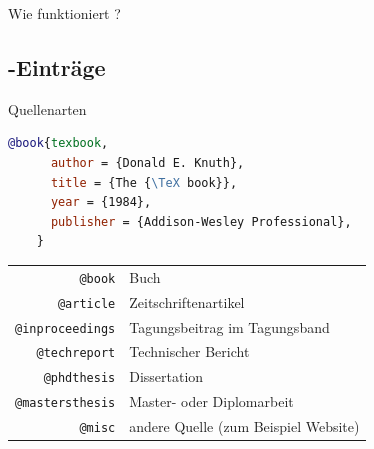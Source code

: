 \begin{Frame}{Wie funktioniert \BibTeX?}
\end{Frame}

\subsection{\BibTeX-Einträge}

\begin{Frame}[fragile]{Quellenarten}
  \begin{lstlisting}[gobble=4,language=BibTeX]
    @book{texbook,
      author = {Donald E. Knuth},
      title = {The {\TeX book}},
      year = {1984},
      publisher = {Addison-Wesley Professional},
    }
  \end{lstlisting}

  \xxx

  \lstset{language=BibTeX}
  \begin{tabular}{r@{ }l}
    \lstinline-@book- & Buch \\
    \lstinline-@article- & Zeitschriftenartikel \\
    \lstinline-@inproceedings- & Tagungsbeitrag im Tagungsband \\
    \lstinline-@techreport- & Technischer Bericht \\
    \lstinline-@phdthesis- & Dissertation \\
    \lstinline-@mastersthesis- & Master- oder Diplomarbeit \\
    \lstinline-@misc- & andere Quelle (zum Beispiel Website)
  \end{tabular}
\end{Frame}


